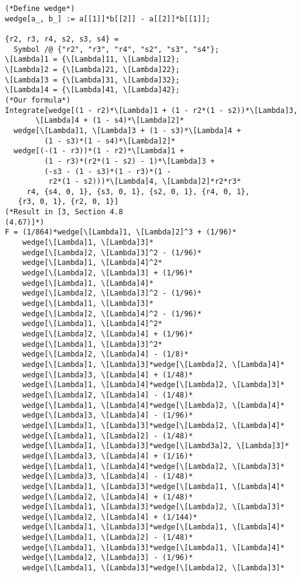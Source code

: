 \documentclass[11pt]{amsart}
\theoremstyle{definition}
\theoremstyle{remark}
\numberwithin{equation}{section}
\begin{document}
\begin{lstlisting}
(*Define wedge*)
wedge[a_, b_] := a[[1]]*b[[2]] - a[[2]]*b[[1]];

{r2, r3, r4, s2, s3, s4} =
  Symbol /@ {"r2", "r3", "r4", "s2", "s3", "s4"};
\[Lambda]1 = {\[Lambda]11, \[Lambda]12};
\[Lambda]2 = {\[Lambda]21, \[Lambda]22};
\[Lambda]3 = {\[Lambda]31, \[Lambda]32};
\[Lambda]4 = {\[Lambda]41, \[Lambda]42};
(*Our formula*)
Integrate[wedge[(1 - r2)*\[Lambda]1 + (1 - r2*(1 - s2))*\[Lambda]3,
       \[Lambda]4 + (1 - s4)*\[Lambda]2]*
  wedge[\[Lambda]1, \[Lambda]3 + (1 - s3)*\[Lambda]4 +
         (1 - s3)*(1 - s4)*\[Lambda]2]*
  wedge[(-(1 - r3))*(1 - r2)*\[Lambda]1 +
         (1 - r3)*(r2*(1 - s2) - 1)*\[Lambda]3 +
         (-s3 - (1 - s3)*(1 - r3)*(1 -
          r2*(1 - s2)))*\[Lambda]4, \[Lambda]2]*r2*r3*
     r4, {s4, 0, 1}, {s3, 0, 1}, {s2, 0, 1}, {r4, 0, 1},
   {r3, 0, 1}, {r2, 0, 1}]
(*Result in [3, Section 4.8
(4.67)]*)
F = (1/864)*wedge[\[Lambda]1, \[Lambda]2]^3 + (1/96)*
    wedge[\[Lambda]1, \[Lambda]3]*
    wedge[\[Lambda]2, \[Lambda]3]^2 - (1/96)*
    wedge[\[Lambda]1, \[Lambda]4]^2*
    wedge[\[Lambda]2, \[Lambda]3] + (1/96)*
    wedge[\[Lambda]1, \[Lambda]4]*
    wedge[\[Lambda]2, \[Lambda]3]^2 - (1/96)*
    wedge[\[Lambda]1, \[Lambda]3]*
    wedge[\[Lambda]2, \[Lambda]4]^2 - (1/96)*
    wedge[\[Lambda]1, \[Lambda]4]^2*
    wedge[\[Lambda]2, \[Lambda]4] + (1/96)*
    wedge[\[Lambda]1, \[Lambda]3]^2*
    wedge[\[Lambda]2, \[Lambda]4] - (1/8)*
    wedge[\[Lambda]1, \[Lambda]3]*wedge[\[Lambda]2, \[Lambda]4]*
    wedge[\[Lambda]3, \[Lambda]4] + (1/48)*
    wedge[\[Lambda]1, \[Lambda]4]*wedge[\[Lambda]2, \[Lambda]3]*
    wedge[\[Lambda]2, \[Lambda]4] - (1/48)*
    wedge[\[Lambda]1, \[Lambda]4]*wedge[\[Lambda]2, \[Lambda]4]*
    wedge[\[Lambda]3, \[Lambda]4] - (1/96)*
    wedge[\[Lambda]1, \[Lambda]3]*wedge[\[Lambda]2, \[Lambda]4]*
    wedge[\[Lambda]1, \[Lambda]2] - (1/48)*
    wedge[\[Lambda]1, \[Lambda]3]*wedge[\[Lambd3a]2, \[Lambda]3]*
    wedge[\[Lambda]3, \[Lambda]4] + (1/16)*
    wedge[\[Lambda]1, \[Lambda]4]*wedge[\[Lambda]2, \[Lambda]3]*
    wedge[\[Lambda]3, \[Lambda]4] - (1/48)*
    wedge[\[Lambda]1, \[Lambda]3]*wedge[\[Lambda]1, \[Lambda]4]*
    wedge[\[Lambda]2, \[Lambda]4] + (1/48)*
    wedge[\[Lambda]1, \[Lambda]3]*wedge[\[Lambda]2, \[Lambda]3]*
    wedge[\[Lambda]2, \[Lambda]4] + (1/144)*
    wedge[\[Lambda]1, \[Lambda]3]*wedge[\[Lambda]1, \[Lambda]4]*
    wedge[\[Lambda]1, \[Lambda]2] - (1/48)*
    wedge[\[Lambda]1, \[Lambda]3]*wedge[\[Lambda]1, \[Lambda]4]*
    wedge[\[Lambda]2, \[Lambda]3] - (1/96)*
    wedge[\[Lambda]1, \[Lambda]3]*wedge[\[Lambda]2, \[Lambda]3]*

\end{lstlisting}
\end{document}
